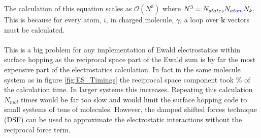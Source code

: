 \noindent The calculation of this equation scales as $\mathcal{O}(N^3)$ where $N^3 = N_{states} N_{at\textcolor{blue}{om}} N_{k}$. This   is because for every atom, $i$, in charged molecule, $\gamma$, a loop over $\mathbf{k}$ vectors must be calculated.   
\\\\
This is a big problem for any implementation of Ewald electrostatics within surface hopping as the reciprocal space part of the Ewald sum is by far the most expensive part of the electrostatics calculation. In fact in the same  molecule system as in figure \ref{fig:ES_Timings} the reciprocal space component took \% of the calculation time. In larger systems this increases. Repeating this calculation $N_{mol}$ times would be far too slow and would limit the surface hopping code to small systems of tens of molecules. However, the damped shifted forces technique (DSF) \cite{DSF} can be used to approximate the electrostatic interactions without the reciprocal force term. 
